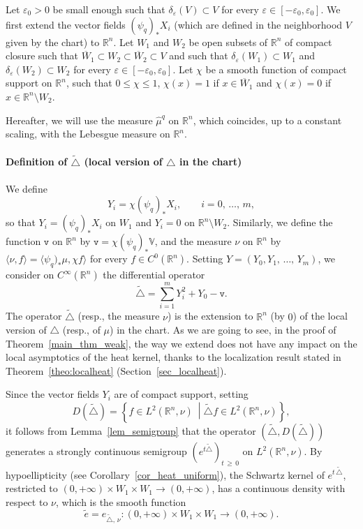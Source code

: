 \documentclass[10pt]{amsart}
\theoremstyle{definition}\newtheorem{defi}[theo]{Definition}\newtheorem{rema}[theo]{Remark}\newtheorem{exam}[theo]{Example}\newtheorem{exem}[theo]{Example}\newtheorem{nota}[theo]{Notation}
\newcommand*\R{\mathbb{R}}
\newcommand{\bbV}{\mathbb{V}}
\newcommand{\ttv}{\mathtt{v}}
\renewcommand{\geq}{\geqslant}
\renewcommand{\leq}{\leqslant}
\begin{document}
Let $\varepsilon_0>0$ be small enough such that $\delta_\varepsilon(V)\subset V$ for every $\varepsilon\in[-\varepsilon_0,\varepsilon_0]$. We first extend the vector fields $(\psi_{q})_*X_i$ (which are defined in the neighborhood $V$ given by the chart) to $\R^n$. Let $W_1$ and $W_2$ be open subsets of $\R^n$ of compact closure such that $\overline W_1\subset W_2\subset\overline W_2\subset V$ and such that $\delta_\varepsilon(W_1)\subset W_1$ and $\delta_\varepsilon(W_2)\subset W_2$ for every $\varepsilon\in[-\varepsilon_0,\varepsilon_0]$. Let $\chi$ be a smooth function of compact support on $\R^n$, such that $0\leq\chi\leq 1$, $\chi(x)=1$ if $x\in \overline W_1$ and $\chi(x)=0$ if $x\in\R^n\setminus W_2$.

Hereafter, we will use the measure $\widehat{\mu}^{q}$ on $\R^n$, which coincides, up to a constant scaling, with the Lebesgue measure on $\R^n$.


\goodbreak
\paragraph{Definition of $\widetilde\triangle$ (local version of $\triangle$ in the chart)}
We define
\[
Y_i = \chi (\psi_{q})_* X_i, \qquad i=0,\,\ldots,\,m,
\]
so that $Y_i = (\psi_{q})_* X_i$ on $W_1$ and $Y_i = 0$ on $\R^n\setminus W_2$. Similarly, we define the function $\ttv$ on $\R^n$ by $\ttv=\chi (\psi_{q})_* \bbV$, and the measure $\nu$ on $\R^n$ by $\langle\nu,f\rangle=\langle\psi_{q})_*\mu,\chi f\rangle$ for every $f\in C^0(\R^n)$. Setting $Y=(Y_0,Y_1,\,\ldots,\,Y_m)$, we consider on $C^\infty(\R^n)$ the differential operator
\begin{equation*}
\widetilde\triangle = \sum_{i=1}^m Y_i^2 + Y_0 - \ttv.
\end{equation*}
The operator $\widetilde\triangle$ (resp., the measure $\nu$) is the extension to $\R^n$ (by $0$) of the local version of $\triangle$ (resp., of $\mu$) in the chart. As we are going to see, in the proof of Theorem~\ref{main_thm_weak}, the way we extend does not have any impact on the local asymptotics of the heat kernel, thanks to the localization result stated in Theorem~\ref{theo:localheat} (Section~\ref{sec_localheat}).

Since the vector fields $Y_i$ are of compact support, setting
\[
D(\widetilde\triangle) = \left\{ f\in L^2(\R^n,\nu) \ \middle| \widetilde\triangle f \in L^2(\R^n,\nu) \right\},
\]
it follows from Lemma~\ref{lem_semigroup} that the operator $(\widetilde\triangle,D(\widetilde\triangle))$ generates a strongly continuous semigroup $(e^{t\widetilde\triangle})_{t\,\geq\,0}$ on $L^2(\R^n,\nu)$. By hypoellipticity (see Corollary~\ref{cor_heat_uniform}), the Schwartz kernel of $e^{t\,\widetilde\triangle}$, restricted to $(0,+\infty)\times W_1\times W_1\rightarrow(0,+\infty)$, has a continuous density with respect to $\nu$, which is the smooth function
\begin{equation*}
\widetilde e = e_{\widetilde\triangle,\,\nu}: (0,+\infty)\times W_1\times W_1\rightarrow(0,+\infty).
\end{equation*}
\end{document}
